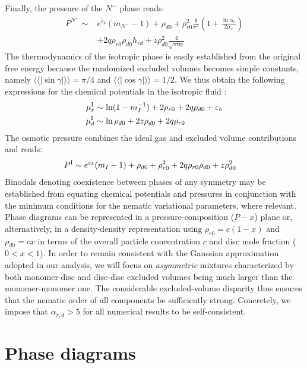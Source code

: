 Finally, the pressure of the $N^{-}$ phase reads:
\begin{align}
P^{N^{-}} \sim & e^{\tilde{\varepsilon}_{b}} (m_{N^{-}} -1) + \rho_{d0} +  \rho_{r0}^{2}  \frac{8}{\pi^{2}} \left ( 1+ \frac{\ln \alpha_{r}}{2 \alpha_{r}}   \right )
 \nonumber \\ 
& +   2 q \rho_{r0}  \rho_{d0}  h_{rd}
 + z \rho_{d0}^{2}  \frac{4}{\sqrt{\pi \alpha_{d}}}
\label{pressurenm} 
\end{align}
The thermodynamics of the isotropic phase is easily established from the original free energy  because the randomized excluded volumes becomes simple constants, namely  $\langle \langle | \sin \gamma | \rangle \rangle = \pi/4$ and $\langle \langle  | \cos \gamma | \rangle \rangle  = 1/2$. We thus obtain the following expressions for the chemical potentials in the isotropic fluid \cite{wensink_mm2019}:
\begin{align}
  \mu_{r}^{\textrm I} & \sim  \ln ( 1- m_{I}^{-1} )  + 2  \rho_{r0}  +   2 q \rho_{d0}  + \varepsilon_{b} \nonumber \\
   \mu_{d}^{\textrm I} & \sim \ln \rho_{d0}  +   2 z \rho_{d0} + 2 q \rho_{r0} 
  \end{align}
The osmotic pressure  combines the ideal gas and excluded volume contributions and reads:
\begin{align}
   P^{\textrm I}  &\sim  e^{\varepsilon_{b}} (m_{I} -1) + \rho_{d0}  +  \rho_{r0}^{2}
+   2 q \rho_{r0}  \rho_{d0}  + z \rho_{d0}^{2} 
\end{align}
Binodals denoting coexistence between phases of any symmetry may be established from equating chemical potentials and pressures in conjunction with the minimum conditions for the nematic variational parameters, where relevant.  Phase diagrams can be represented in a pressure-composition  ($P-x$) plane or, alternatively, in a density-density representation using $\rho_{r0} = c (1-x)$ and $\rho_{d0}  = cx$ in terms of the overall particle concentration $c$ and disc mole fraction ($0<x<1$). In order to remain consistent with the Gaussian approximation adopted in our analysis, we will focus on {\em asymmetric} mixtures characterized by both monomer-disc and disc-disc excluded volumes being much larger than the monomer-monomer one. The considerable excluded-volume disparity thus ensures that the nematic order of all components be sufficiently strong. Concretely, we impose that $\alpha_{r,d} >5$  for all numerical results to be self-consistent. 


\section{Phase diagrams}

